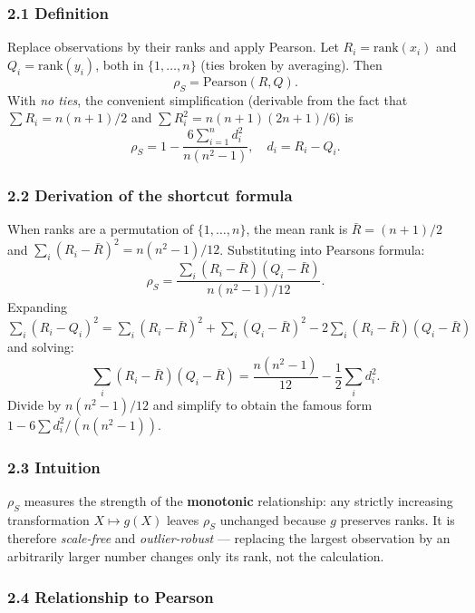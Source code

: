 \documentclass{article}
\begin{document}
\subsubsection{2.1 Definition}\label{21-definition}

Replace observations by their ranks and apply Pearson. Let
\(R_i = \mathrm{rank}(x_i)\) and \(Q_i = \mathrm{rank}(y_i)\), both in
\(\{1, \dots, n\}\) (ties broken by averaging). Then \[
\rho_S = \mathrm{Pearson}(R, Q).
\] With \emph{no ties}, the convenient simplification (derivable from
the fact that \(\sum R_i = n(n+1)/2\) and
\(\sum R_i^2 = n(n+1)(2n+1)/6\)) is \[
\rho_S = 1 - \frac{6 \sum_{i=1}^{n} d_i^2}{n(n^2 - 1)}, \quad d_i = R_i - Q_i.
\]

\subsubsection{2.2 Derivation of the shortcut
formula}\label{22-derivation-of-the-shortcut-formula}

When ranks are a permutation of \(\{1, \dots, n\}\), the mean rank is
\(\bar{R} = (n+1)/2\) and \(\sum_i (R_i - \bar{R})^2 = n(n^2 - 1)/12\).
Substituting into Pearson\textquotesingle s formula: \[
\rho_S = \frac{\sum_i (R_i - \bar{R})(Q_i - \bar{R})}{n(n^2 - 1)/12}.
\] Expanding
\(\sum_i (R_i - Q_i)^2 = \sum_i (R_i - \bar{R})^2 + \sum_i (Q_i - \bar{R})^2 - 2 \sum_i (R_i - \bar{R})(Q_i - \bar{R})\)
and solving: \[
\sum_i (R_i - \bar{R})(Q_i - \bar{R}) = \frac{n(n^2 - 1)}{12} - \frac{1}{2}\sum_i d_i^2.
\] Divide by \(n(n^2 - 1)/12\) and simplify to obtain the famous form
\(1 - 6\sum d_i^2 / (n(n^2 - 1))\).

\subsubsection{2.3 Intuition}\label{23-intuition}

\(\rho_S\) measures the strength of the \textbf{monotonic} relationship:
any strictly increasing transformation \(X \mapsto g(X)\) leaves
\(\rho_S\) unchanged because \(g\) preserves ranks. It is therefore
\emph{scale-free} and \emph{outlier-robust} --- replacing the largest
observation by an arbitrarily larger number changes only its rank, not
the calculation.

\subsubsection{2.4 Relationship to
Pearson}\label{24-relationship-to-pearson}
\end{document}
